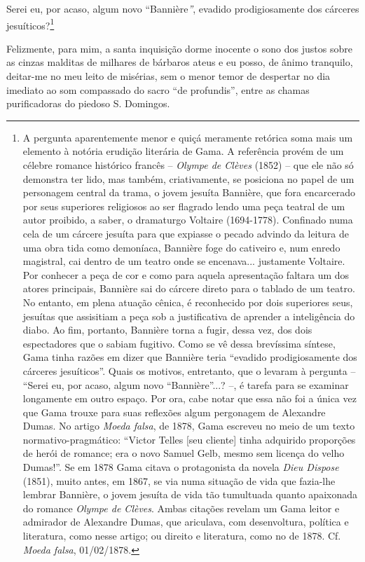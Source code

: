 Serei eu, por acaso, algum novo ``Bannière\emph{''}, evadido
prodigiosamente dos cárceres jesuíticos?\footnote{A pergunta
  aparentemente menor e quiçá meramente retórica soma mais um elemento à
  notória erudição literária de Gama. A referência provém de um célebre
  romance histórico francês -- \emph{Olympe de Clèves} (1852) -- que ele
  não só demonstra ter lido, mas também, criativamente, se posiciona no
  papel de um personagem central da trama, o jovem jesuíta Bannière, que
  fora encarcerado por seus superiores religiosos ao ser flagrado lendo
  uma peça teatral de um autor proibido, a saber, o dramaturgo Voltaire
  (1694-1778). Confinado numa cela de um cárcere jesuíta para que
  expiasse o pecado advindo da leitura de uma obra tida como demoníaca,
  Bannière foge do cativeiro e, num enredo magistral, cai dentro de um
  teatro onde se encenava... justamente Voltaire. Por conhecer a peça de
  cor e como para aquela apresentação faltara um dos atores principais,
  Bannière sai do cárcere direto para o tablado de um teatro. No
  entanto, em plena atuação cênica, é reconhecido por dois superiores
  seus, jesuítas que assisitiam a peça sob a justificativa de aprender a
  inteligência do diabo. Ao fim, portanto, Bannière torna a fugir, dessa
  vez, dos dois espectadores que o sabiam fugitivo. Como se vê dessa
  brevíssima síntese, Gama tinha razões em dizer que Bannière teria
  ``evadido prodigiosamente dos cárceres jesuíticos''. Quais os motivos,
  entretanto, que o levaram à pergunta -- ``Serei eu, por acaso, algum
  novo ``Bannière''...? --, é tarefa para se examinar longamente em outro
  espaço. Por ora, cabe notar que essa não foi a única vez que Gama
  trouxe para suas reflexões algum pergonagem de Alexandre Dumas. No
  artigo \emph{Moeda falsa}, de 1878, Gama escreveu no meio de um texto
  normativo-pragmático: ``Victor Telles {[}seu cliente{]} tinha adquirido
  proporções de herói de romance; era o novo Samuel Gelb, mesmo sem
  licença do velho Dumas!''. Se em 1878 Gama citava o protagonista da
  novela \emph{Dieu Dispose} (1851), muito antes, em 1867, se via numa
  situação de vida que fazia-lhe lembrar Bannière, o jovem jesuíta de
  vida tão tumultuada quanto apaixonada do romance \emph{Olympe de
  Clèves}. Ambas citações revelam um Gama leitor e admirador de
  Alexandre Dumas, que ariculava, com desenvoltura, política e
  literatura, como nesse artigo; ou direito e literatura, como no de
  1878. Cf. \emph{Moeda falsa}, 01/02/1878.}

Felizmente, para mim, a santa inquisição dorme inocente o sono dos
justos sobre as cinzas malditas de milhares de bárbaros ateus e eu
posso, de ânimo tranquilo, deitar-me no meu leito de misérias, sem o
menor temor de despertar no dia imediato ao som compassado do sacro ``de
profundis'', entre as chamas purificadoras do piedoso S. Domingos.

